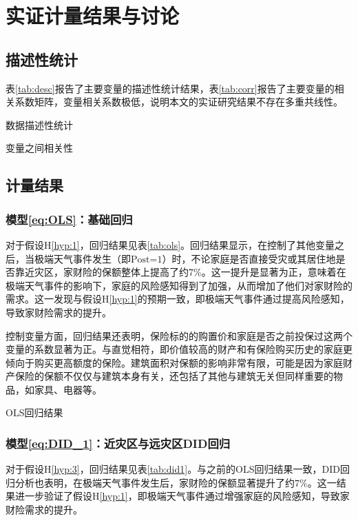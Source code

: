 \chapter{实证计量结果与讨论}\label{chap:4}
\section{描述性统计}

表\ref{tab:desc}报告了主要变量的描述性统计结果，表\ref{tab:corr}报告了主要变量的相关系数矩阵，变量相关系数极低，说明本文的实证研究结果不存在多重共线性。
\begin{table}[H]
    \caption{数据描述性统计}\label{tab:desc}
    \centering
    
\end{table}
\begin{table}[H]
    \caption{变量之间相关性}\label{tab:corr}
    \centering
    
\end{table}

\section{计量结果}
\subsection{模型\ref{eq:OLS}：基础回归}
对于假设H\ref{hyp:1}，回归结果见表\ref{tab:ols}。回归结果显示，在控制了其他变量之后，当极端天气事件发生（即$\text{Post=1}$）时，不论家庭是否直接受灾或其居住地是否靠近灾区，家财险的保额整体上提高了约7\%。这一提升是显著为正，意味着在极端天气事件的影响下，家庭的风险感知得到了加强，从而增加了他们对家财险的需求。这一发现与假设H\ref{hyp:1}的预期一致，即极端天气事件通过提高风险感知，导致家财险需求的提升。

控制变量方面，回归结果还表明，保险标的的购置价和家庭是否之前投保过这两个变量的系数显著为正。与直觉相符，即价值较高的财产和有保险购买历史的家庭更倾向于购买更高额度的保险。建筑面积对保额的影响非常有限，可能是因为家庭财产保险的保额不仅仅与建筑本身有关，还包括了其他与建筑无关但同样重要的物品，如家具、电器等。

\begin{table}[htbp]
    \centering
    \caption{OLS回归结果}\label{tab:ols}
    
\end{table}

\subsection{模型\ref{eq:DID_1}：近灾区与远灾区DID回归}
对于假设H\ref{hyp:3}，回归结果见表\ref{tab:did1}。与之前的OLS回归结果一致，DID回归分析也表明，在极端天气事件发生后，家财险的保额显著提升了约7\%。这一结果进一步验证了假设H\ref{hyp:1}，即极端天气事件通过增强家庭的风险感知，导致家财险需求的提升。

